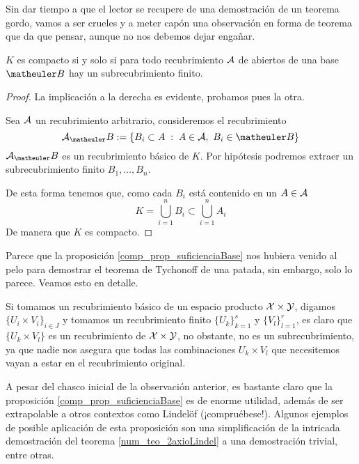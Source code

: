Sin dar tiempo a que el lector se recupere de una demostración de un teorema gordo, vamos a ser crueles y a meter capón una observación en forma de teorema que da que pensar, aunque no nos debemos dejar engañar.
\begin{prop}
	\label{comp_prop_suficienciaBase}
	$K$ es compacto si y solo si para todo recubrimiento $\mathcal{A}$ de abiertos de una base $\B$ hay un subrecubrimiento finito.
\end{prop}
\begin{proof}
	La implicación a la derecha es evidente, probamos pues la otra.
	
	Sea $\mathcal{A}$ un recubrimiento arbitrario, consideremos el recubrimiento
	\begin{equation*}
		\mc{A}_\B:=\{B_i\subset A \midc A\in\mc{A},\ B_i\in\B\}
	\end{equation*}
	$\mc{A}_\B$ es un recubrimiento básico de $K$. Por hipótesis podremos extraer un subrecubrimiento finito $B_1,\dots,B_n$.
	
	De esta forma tenemos que, como cada $B_i$ está contenido en un $A\in\mathcal{A}$
	\begin{equation*}
		K=\bigcup_{i=1}^nB_i\subset \bigcup_{i=1}^n A_i
	\end{equation*}
	De manera que $K$ es compacto.
\end{proof}
\begin{obs}[Tychonoff]
	Parece que la proposición \ref{comp_prop_suficienciaBase} nos hubiera venido al pelo para demostrar el teorema de Tychonoff de una patada, sin embargo, solo lo parece. Veamos esto en detalle.
	
	Si tomamos un recubrimiento básico de un espacio producto $\mathcal{X}\times \mathcal{Y}$, digamos $\{U_i\times V_i\}_{i\in J}$ y tomamos un recubrimiento finito $\{U_k\}_{k=1}^s$ y $\{V_l\}_{l=1}^r$, es claro que $\{U_k\times V_l\}$ es un recubrimiento de $\mathcal{X} \times \mathcal{Y}$, no obstante, no es un subrecubrimiento, ya que nadie nos asegura que todas las combinaciones $U_k\times V_l$ que necesitemos vayan a estar en el recubrimiento original.
\end{obs}
\begin{obs}[Simplificaciones]
	A pesar del chasco inicial de la observación anterior, es bastante claro que la proposición \ref{comp_prop_suficienciaBase} es de enorme utilidad, además de ser extrapolable a otros contextos como Lindelöf (¡compruébese!). Algunos ejemplos de posible aplicación de esta proposición son una simplificación de la intricada demostración del teorema \ref{num_teo_2axioLindel} a una demostración trivial, entre otras.
\end{obs}
